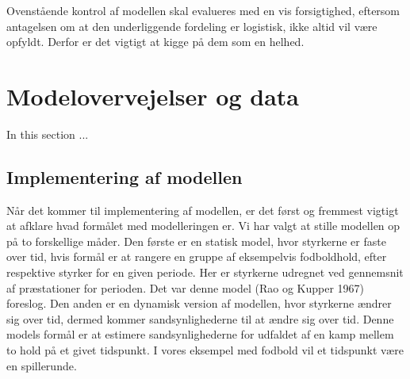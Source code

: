 \documentclass[11pt,a4paper]{article}
\begin{document}
Ovenstående kontrol af modellen skal evalueres med en vis forsigtighed, eftersom antagelsen om at den underliggende fordeling er logistisk, ikke altid vil være opfyldt. Derfor er det vigtigt at kigge på dem som en helhed. 

\section{Modelovervejelser og data}
In this section ...
\subsection{Implementering af modellen}
Når det kommer til implementering af modellen, er det først og fremmest vigtigt at afklare hvad formålet med modelleringen er. Vi har valgt at stille modellen op på to forskellige måder. Den første er en statisk model, hvor styrkerne er faste over tid, hvis formål er at rangere en gruppe af eksempelvis fodboldhold, efter respektive styrker for en given periode. Her er styrkerne udregnet ved gennemsnit af præstationer for perioden. Det var denne model (Rao og Kupper 1967) foreslog. Den anden er en dynamisk version af modellen, hvor styrkerne ændrer sig over tid, dermed kommer sandsynlighederne til at ændre sig over tid. Denne models formål er at estimere sandsynlighederne for udfaldet af en kamp mellem to hold på et givet tidspunkt. I vores eksempel med fodbold vil et tidspunkt være en spillerunde. 
\end{document}
